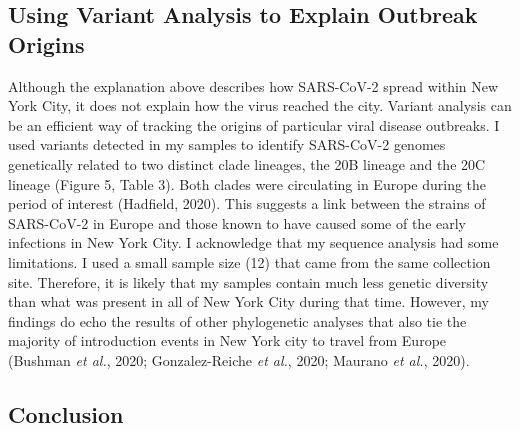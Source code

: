 \documentclass[
]{article}
\begin{document}
\hypertarget{using-variant-analysis-to-explain-outbreak-origins}{%
\subsection{Using Variant Analysis to Explain Outbreak
Origins}\label{using-variant-analysis-to-explain-outbreak-origins}}

Although the explanation above describes how SARS-CoV-2 spread within
New York City, it does not explain how the virus reached the city.
Variant analysis can be an efficient way of tracking the origins of
particular viral disease outbreaks. I used variants detected in my
samples to identify SARS-CoV-2 genomes genetically related to two
distinct clade lineages, the 20B lineage and the 20C lineage (Figure 5,
Table 3). Both clades were circulating in Europe during the period of
interest (Hadfield, 2020). This suggests a link between the strains of
SARS-CoV-2 in Europe and those known to have caused some of the early
infections in New York City. I acknowledge that my sequence analysis had
some limitations. I used a small sample size (12) that came from the
same collection site. Therefore, it is likely that my samples contain
much less genetic diversity than what was present in all of New York
City during that time. However, my findings do echo the results of other
phylogenetic analyses that also tie the majority of introduction events
in New York city to travel from Europe (Bushman \emph{et al.}, 2020;
Gonzalez-Reiche \emph{et al.}, 2020; Maurano \emph{et al.}, 2020).

\hypertarget{conclusion}{%
\subsection{Conclusion}\label{conclusion}}
\end{document}
